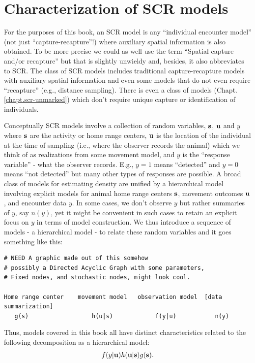 \section{Characterization of SCR models}
\label{intro.sec.characterization}

For the purposes of this book, an SCR model is any ``individual
encounter model'' (not just ``capture-recapture''!) where auxiliary
spatial information is also obtained. To be more precise we could as
well use the term ``Spatial capture and/or recapture'' but that is
slightly unwieldy and, besides, it also abbreviates to SCR. The class
of SCR models includes traditional capture-recapture models with
auxiliary spatial information and even some
models that do not even require ``recapture'' (e.g., distance
sampling).  There is even a class of models (Chapt. \ref{chapt.scr-unmarked})
which don't require unique capture or
identification of individuals.

Conceptually SCR models involve a collection of random
variables, ${\bf s}$, ${\bf u}$ and $y$ where ${\bf s}$ are the
activity or home range centers, ${\bf u}$ is the location of the
individual at the time of sampling (i.e., where the observer records
the animal) which we think of as realizations from some movement
model, and $y$ is the ``response variable'' - what the observer
records. E.g., $y=1$ means ``detected'' and $y=0$ means ``not
detected'' but many other types of responses are possible.
A broad class of models for estimating density are unified by a
hierarchical model involving explicit models for
animal home range centers ${\bf s}$, movement outcomes ${\bf u}$, and
encounter data $y$.  In some cases, we don't observe $y$ but rather
summaries of $y$, say $n(y)$, yet it might be convenient in such cases
to retain an explicit focus on $y$ in terms of model construction.
We thus introduce a sequence of models - a hierarchical model -
to relate these random variables and it goes something like this:
{\small
\begin{verbatim}
# NEED A graphic made out of this somehow
# possibly a Directed Acyclic Graph with some parameters,
# Fixed nodes, and stochastic nodes, might look cool.

Home range center    movement model   observation model  [data summarization]
   g(s)                  h(u|s)            f(y|u)	        n(y)
\end{verbatim}
}
Thus, models covered in this book all have distinct
characteristics related to the following decomposition as a
hierarchical model:
\[
f(y|{\bf u})h({\bf u}|{\bf s})g({\bf s}).
\]

